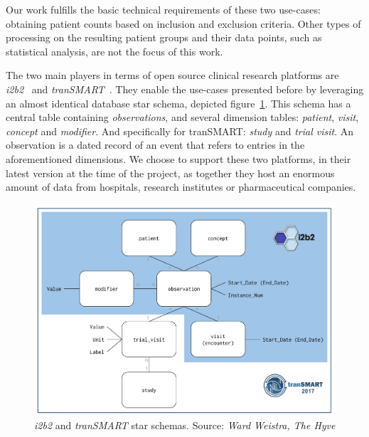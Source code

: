 Our work fulfills the basic technical requirements of these two use-cases: obtaining patient counts based on inclusion and exclusion criteria.
Other types of processing on the resulting patient groups and their data points, such as statistical analysis, are not the focus of this work.

The two main players in terms of open source clinical research platforms are \emph{i2b2}~\cite{murphy2010serving} and \emph{tranSMART}~\cite{scheufele2014transmart}.
They enable the use-cases presented before by leveraging an almost identical database star schema, depicted figure~\ref{fig:star-schema}.
This schema has a central table containing \emph{observations}, and several dimension tables: \emph{patient}, \emph{visit}, \emph{concept} and \emph{modifier}.
And specifically for tranSMART: \emph{study} and \emph{trial visit}.
An observation is a dated record of an event that refers to entries in the aforementioned dimensions.
We choose to support these two platforms, in their latest version at the time of the project, as together they host an enormous amount of data from hospitals, research institutes or pharmaceutical companies.

\begin{figure}[ht]
    \centering
    \includegraphics[width=1\textwidth]{figures/star_schema.pdf}
    \caption{\emph{i2b2} and \emph{tranSMART} star schemas. Source: \emph{Ward Weistra, The Hyve}}
    \label{fig:star-schema}
\end{figure}

